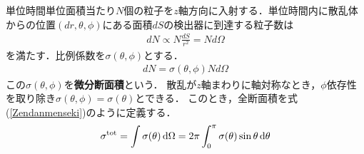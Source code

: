 \documentclass{report}
\begin{document}
単位時間単位面積当たり$N$個の粒子を$z$軸方向に入射する．単位時間内に散乱体からの位置$(dr,\theta,\phi)$にある面積$dS$の検出器に到達する粒子数は
\begin{align}
  dN \propto N \frac{dS}{r^2} = Nd\Omega
\end{align}
を満たす．比例係数を$\sigma (\theta, \phi)$とする．
\begin{align}
  dN = \sigma(\theta, \phi) N d\Omega
\end{align}
この$\sigma(\theta ,\phi)$を\textbf{微分断面積}という．
散乱が$z$軸まわりに軸対称なとき，$\phi$依存性を取り除き$\sigma(\theta, \phi) = \sigma (\theta)$とできる．
このとき，全断面積を式(\ref{Zendanmenseki})のように定義する．
\begin{align}
  \sigma^{\mathrm{tot}} = \int \sigma(\theta) \dd{\Omega} = 2\pi \int_{0}^{\pi} \sigma(\theta) \sin \theta \dd{\theta}
\end{align}
\end{document}

